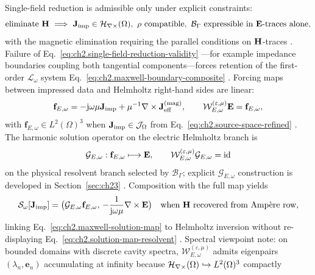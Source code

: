 Single-field reduction is admissible only under explicit constraints:
\begin{equation}
\label{eq:ch2.single-field-reduction-validity}
\text{eliminate }\H
\ \Longrightarrow\
\Jimp\in\HCurl(\Omega),\ \rho\ \text{compatible},\ 
\mathcal{B}_\Gamma\ \text{expressible in }\E\text{-traces alone},
\end{equation}
with the magnetic elimination requiring the parallel conditions on \(\mathbf{H}\)-traces
\cite{stratton1941}. Failure of Eq.~\eqref{eq:ch2.single-field-reduction-validity}
---for example impedance boundaries coupling both tangential components---forces
retention of the first-order \(\mathcal{L}_\omega\) system
Eq.~\eqref{eq:ch2.maxwell-boundary-composite} \cite{harrington2001}.
Forcing maps between impressed data and Helmholtz right-hand sides are linear:
\begin{equation}
\label{eq:ch2.helmholtz-forcing-map}
\mathbf{f}_{E,\omega}
=
-\mathrm{j}\omega\mu\mathbf{J}_{\mathrm{imp}}+\mu^{-1}\nabla\times\mathbf{J}^{\mathrm{(mag)}}_{\mathrm{eff}},
\qquad
\mathcal{W}_{E,\omega}^{(\varepsilon,\mu)}\mathbf{E}=\mathbf{f}_{E,\omega},
\end{equation}
with \(\mathbf{f}_{E,\omega}\in L^{2}(\Omega)^{3}\) when
\(\mathbf{J}_{\mathrm{imp}}\in\mathcal{J}_\Omega\) from Eq.~\eqref{eq:ch2.source-space-refined}
\cite{stratton1941}. The harmonic solution operator on the electric Helmholtz branch
is
\begin{equation}
\label{eq:ch2.helmholtz-solution-operator}
\mathcal{G}_{E,\omega}:\mathbf{f}_{E,\omega}\longmapsto\mathbf{E},
\qquad
\mathcal{W}_{E,\omega}^{(\varepsilon,\mu)}\mathcal{G}_{E,\omega}=\mathrm{id}
\end{equation}
on the physical resolvent branch selected by \(\mathcal{B}_\Gamma\); explicit
\(\mathcal{G}_{E,\omega}\) construction is developed in Section~\ref{sec:ch23}
\cite{harrington2001}. Composition with the full map yields
\begin{equation}
\label{eq:ch2.frequency-solution-composition}
\mathcal{S}_\omega[\mathbf{J}_{\mathrm{imp}}]
=
\big(\mathcal{G}_{E,\omega}\mathbf{f}_{E,\omega},\,
-\frac{1}{\mathrm{j}\omega\mu}\nabla\times\mathbf{E}\big)
\quad\text{when }\mathbf{H}\ \text{recovered from Amp\`ere row},
\end{equation}
linking Eq.~\eqref{eq:ch2.maxwell-solution-map} to Helmholtz inversion without
re-displaying Eq.~\eqref{eq:ch2.solution-map-resolvent} \cite{stratton1941}.
Spectral viewpoint note: on bounded domains with discrete cavity spectra,
\(\mathcal{W}_{E,\omega}^{(\varepsilon,\mu)}\) admits eigenpairs
\((\lambda_n,\mathbf{e}_n)\) accumulating at infinity because
\(\mathcal{H}_{\nabla\times}(\Omega)\hookrightarrow L^{2}(\Omega)^{3}\) compactly
